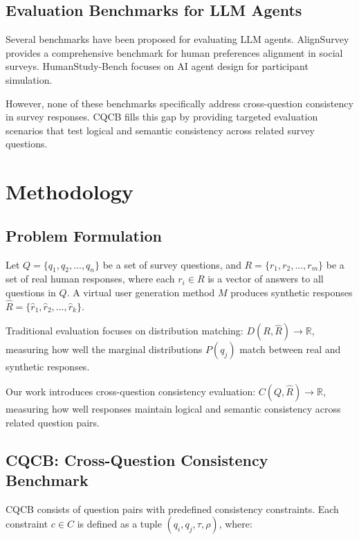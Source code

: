 \documentclass{article}
\begin{document}
\subsection{Evaluation Benchmarks for LLM Agents}

Several benchmarks have been proposed for evaluating LLM agents. AlignSurvey \cite{liu2025alignsurvey} provides a comprehensive benchmark for human preferences alignment in social surveys. HumanStudy-Bench \cite{zhang2026humanstudy} focuses on AI agent design for participant simulation.

However, none of these benchmarks specifically address cross-question consistency in survey responses. CQCB fills this gap by providing targeted evaluation scenarios that test logical and semantic consistency across related survey questions.

\section{Methodology}

\subsection{Problem Formulation}

Let $Q = \{q_1, q_2, ..., q_n\}$ be a set of survey questions, and $R = \{r_1, r_2, ..., r_m\}$ be a set of real human responses, where each $r_i \in R$ is a vector of answers to all questions in $Q$. A virtual user generation method $M$ produces synthetic responses $\hat{R} = \{\hat{r}_1, \hat{r}_2, ..., \hat{r}_k\}$.

Traditional evaluation focuses on distribution matching: $D(R, \hat{R}) \rightarrow \mathbb{R}$, measuring how well the marginal distributions $P(q_j)$ match between real and synthetic responses.

Our work introduces cross-question consistency evaluation: $C(Q, \hat{R}) \rightarrow \mathbb{R}$, measuring how well responses maintain logical and semantic consistency across related question pairs.

\subsection{CQCB: Cross-Question Consistency Benchmark}

CQCB consists of question pairs with predefined consistency constraints. Each constraint $c \in C$ is defined as a tuple $(q_i, q_j, \tau, \rho)$, where:
\end{document}
